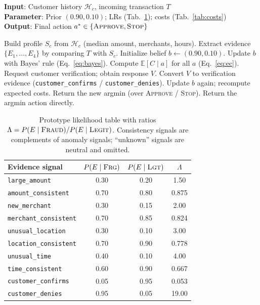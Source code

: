 \documentclass{article}
\begin{document}
\begin{algorithm}[tb]
\caption{Transaction decision loop}
\label{alg:pipeline}
\textbf{Input}: Customer history $\mathcal{H}_c$, incoming transaction $T$\\
\textbf{Parameter}: Prior $(0.90, 0.10)$; LRs (Tab.~\ref{tab:likelihoods}); costs (Tab.~\ref{tab:costs})\\
\textbf{Output}: Final action $a^* \in \{\textsc{Approve}, \textsc{Stop}\}$
\begin{algorithmic}[1]
\STATE Build profile $S_c$ from $\mathcal{H}_c$ (median amount, merchants, hours).
\STATE Extract evidence $\{E_1,\dots,E_4\}$ by comparing $T$ with $S_c$.
\STATE Initialize belief $b \leftarrow (0.90, 0.10)$.
  \STATE Update $b$ with Bayes' rule (Eq.~\eqref{eq:bayes}).
\ENDFOR
\STATE Compute $\mathbb{E}[C \mid a]$ for all $a$ (Eq.~\eqref{eq:ec}).
  \STATE Request customer verification; obtain response $V$.
  \STATE Convert $V$ to verification evidence (\texttt{customer\_confirms} /
  \texttt{customer\_denies}).
  \STATE Update $b$ again; recompute expected costs.
  \STATE Return the new argmin (over \textsc{Approve} / \textsc{Stop}).
\ELSE
  \STATE Return the argmin action directly.
\ENDIF
\end{algorithmic}
\end{algorithm}

\begin{table}[tb]
\centering
\footnotesize
\setlength{\tabcolsep}{4pt}
\begin{tabular}{lccc}
\toprule
Evidence signal & $P(E\mid\textsc{Frg})$ & $P(E\mid\textsc{Lgt})$ & $\Lambda$ \\
\midrule
\texttt{large\_amount}      & 0.30 & 0.20 & 1.50 \\
\texttt{amount\_consistent} & 0.70 & 0.80 & 0.875 \\
\texttt{new\_merchant}      & 0.30 & 0.15 & 2.00 \\
\texttt{merchant\_consistent}& 0.70 & 0.85 & 0.824 \\
\texttt{unusual\_location}  & 0.30 & 0.10 & 3.00 \\
\texttt{location\_consistent}& 0.70 & 0.90 & 0.778 \\
\texttt{unusual\_time}      & 0.40 & 0.10 & 4.00 \\
\texttt{time\_consistent}   & 0.60 & 0.90 & 0.667 \\
\texttt{customer\_confirms} & 0.05 & 0.95 & 0.053 \\
\texttt{customer\_denies}   & 0.95 & 0.05 & 19.00 \\
\bottomrule
\end{tabular}
\caption{Prototype likelihood table with ratios $\Lambda =
P(E\mid\textsc{Fraud})/P(E\mid\textsc{Legit})$. Consistency signals are
complements of anomaly signals; ``unknown'' signals are neutral and omitted.}
\label{tab:likelihoods}
\end{table}
\end{document}
